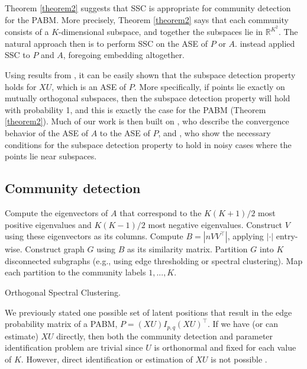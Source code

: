 \documentclass[12pt]{article}
\begin{document}
Theorem \ref{theorem2} suggests that SSC is appropriate for community
detection for the PABM. More precisely, Theorem \ref{theorem2} says that
each community consists of a \(K\)-dimensional subspace, and together
the subspaces lie in \(\mathbb{R}^{K^2}\). The natural approach then is
to perform SSC on the ASE of \(P\) or \(A\).
\citeauthor{noroozi2019estimation} instead applied SSC to \(P\) and
\(A\), foregoing embedding altogether.

Using results from \citet{soltanolkotabi2012}, it can be easily shown
that the subspace detection property holds for \(XU\), which is an ASE
of \(P\). More specifically, if points lie exactly on mutually
orthogonal subspaces, then the subspace detection property will hold
with probability 1, and this is exactly the case for the PABM (Theorem
\ref{theorem2}). Much of our work is then built on
\citeauthor{rubindelanchy2017statistical}, who describe the convergence
behavior of the ASE of \(A\) to the ASE of \(P\), and
\citet{jmlr-v28-wang13}, who show the necessary conditions for the
subspace detection property to hold in noisy cases where the points lie
near subspaces.

\hypertarget{community-detection}{%
\subsection{Community detection}\label{community-detection}}

\begin{algorithm}[t]
  \DontPrintSemicolon
  \SetAlgoLined
    Compute the eigenvectors of $A$ that correspond to the $K (K+1) / 2$ most
    positive eigenvalues and $K (K-1) / 2$ most negative eigenvalues. Construct
    $V$ using these eigenvectors as its columns.\;
    Compute $B = |n V V^\top|$, applying $|\cdot|$ entry-wise.\;
    Construct graph $G$ using $B$ as its similarity matrix.\;
    Partition $G$ into $K$ disconnected subgraphs
    (e.g., using edge thresholding or spectral clustering).\;
    Map each partition to the community labels $1, ..., K$.\;
  \caption{Orthogonal Spectral Clustering.}
\end{algorithm}

We previously stated one possible set of latent positions that result in
the edge probability matrix of a PABM, \(P = (XU) I_{p, q} (XU)^\top\). If
we have (or can estimate) \(XU\) directly, then both the community
detection and parameter identification problem are trivial since \(U\)
is orthonormal and fixed for each value of \(K\). However, direct
identification or estimation of \(XU\) is not possible
\cite{rubindelanchy2017statistical}.
\end{document}
